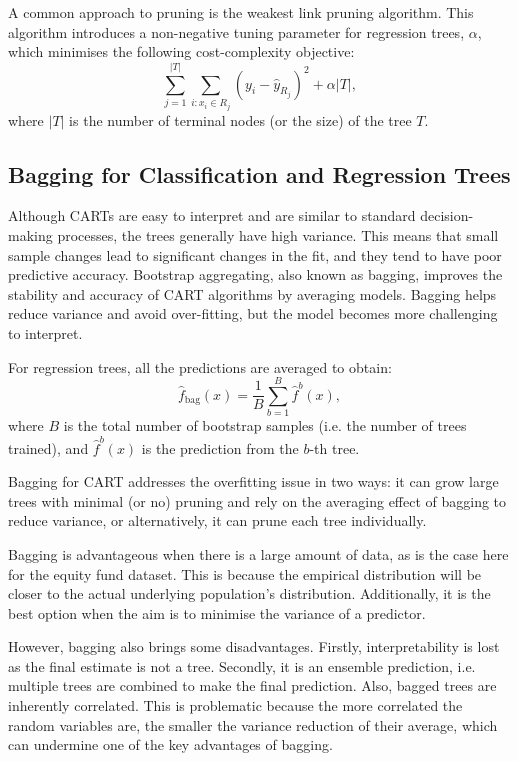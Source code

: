 \documentclass[11pt]{report} %
\begin{document}
A common approach to pruning is the weakest link pruning algorithm. This algorithm introduces a non-negative tuning parameter for regression trees, $\alpha$, which minimises the following cost-complexity objective:
\[
\sum_{j=1}^{|T|} \sum_{i : x_i \in R_j} (y_i - \hat{y}_{R_j})^2 + \alpha |T|,
\]
where $|T|$ is the number of terminal nodes (or the size) of the tree $T$.

\subsection{Bagging for Classification and Regression Trees}
Although CARTs are easy to interpret and are similar to standard decision-making processes, the trees generally have high variance. This means that small sample changes lead to significant changes in the fit, and they tend to have poor predictive accuracy. Bootstrap aggregating, also known as bagging, improves the stability and accuracy of CART algorithms by averaging models. Bagging helps reduce variance and avoid over-fitting, but the model becomes more challenging to interpret.

\noindent For regression trees, all the predictions are averaged to obtain:
\[
\hat{f}_{\text{bag}}(x) = \frac{1}{B} \sum_{b=1}^B \hat{f}^b(x),
\]
where \( B \) is the total number of bootstrap samples (i.e. the number of trees trained), and \( \hat{f}^b(x) \) is the prediction from the \( b \)-th tree.

Bagging for CART addresses the overfitting issue in two ways: it can grow large trees with minimal (or no) pruning and rely on the averaging effect of bagging to reduce variance, or alternatively, it can prune each tree individually.

Bagging is advantageous when there is a large amount of data, as is the case here for the equity fund dataset. This is because the empirical distribution will be closer to the actual underlying population's distribution. Additionally, it is the best option when the aim is to minimise the variance of a predictor. 

However, bagging also brings some disadvantages. Firstly, interpretability is lost as the final estimate is not a tree. Secondly, it is an ensemble prediction, i.e. multiple trees are combined to make the final prediction.\cite{DataScienceProcess2019} Also, bagged trees are inherently correlated. This is problematic because the more correlated the random variables are, the smaller the variance reduction of their average, which can undermine one of the key advantages of bagging. 
\end{document}
